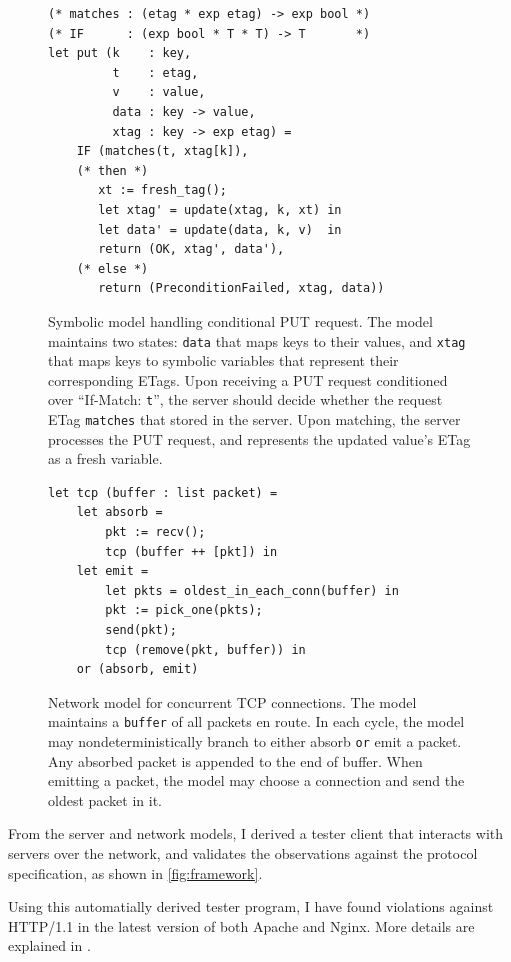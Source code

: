 \documentclass[12pt,oneside]{amsbook}
\newcommand{\ilc}[1]{\lstinline[style=customcoq]{#1}}
\numberwithin{section}{chapter}
\numberwithin{figure}{chapter}
\numberwithin{equation}{chapter}
\begin{document}
\begin{figure}
\begin{lstlisting}[style=customcoq]
(* matches : (etag * exp etag) -> exp bool *)
(* IF      : (exp bool * T * T) -> T       *)
let put (k    : key,
         t    : etag,
         v    : value,
         data : key -> value,
         xtag : key -> exp etag) =
    IF (matches(t, xtag[k]),
    (* then *)
       xt := fresh_tag();
       let xtag' = update(xtag, k, xt) in
       let data' = update(data, k, v)  in
       return (OK, xtag', data'),
    (* else *)
       return (PreconditionFailed, xtag, data))
\end{lstlisting}
\caption{Symbolic model handling conditional PUT request.  The model maintains
  two states: \ilc{data} that maps keys to their values, and \ilc{xtag} that
  maps keys to symbolic variables that represent their corresponding ETags.
  Upon receiving a PUT request conditioned over ``If-Match: \ilc{t}'', the
  server should decide whether the request ETag \ilc{matches} that stored in the
  server.  Upon matching, the server processes the PUT request, and represents
  the updated value's ETag as a fresh variable.
}
\label{fig:if-match-model}
\end{figure}

\begin{figure}
\begin{lstlisting}[style=customcoq]
let tcp (buffer : list packet) =
    let absorb =
        pkt := recv();
        tcp (buffer ++ [pkt]) in
    let emit =
        let pkts = oldest_in_each_conn(buffer) in
        pkt := pick_one(pkts);
        send(pkt);
        tcp (remove(pkt, buffer)) in
    or (absorb, emit)
\end{lstlisting}
\caption{Network model for concurrent TCP connections.  The model maintains a
  \ilc{buffer} of all packets en route.  In each cycle, the model may
  nondeterministically branch to either absorb \ilc{or} emit a packet.  Any
  absorbed packet is appended to the end of buffer.  When emitting a packet, the
  model may choose a connection and send the oldest packet in it.  }
\label{fig:tcp-model}
\end{figure}

From the server and network models, I derived a tester client that interacts
with servers over the network, and validates the observations against the
protocol specification, as shown in \autoref{fig:framework}.

Using this automatially derived tester program, I have found violations against
HTTP/1.1 in the latest version of both Apache and Nginx.  More details are
explained in \textcite{issta21}.
\end{document}
